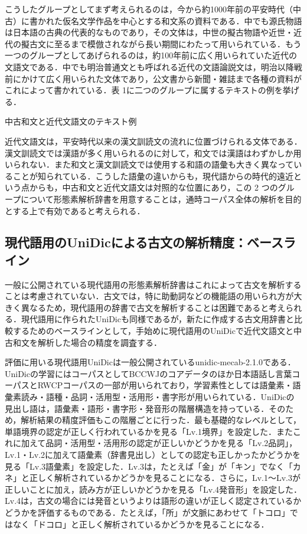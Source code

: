 \documentclass[japanese]{jnlp_1.4}
\begin{document}
こうしたグループとしてまず考えられるのは，今から約1000年前の平安時代（中古）に書かれた仮名文学作品を中心とする和文系の資料である．中でも源氏物語は日本語の古典の代表的なものであり，その文体は，中世の擬古物語や近世・近代の擬古文に至るまで模倣されながら長い期間にわたって用いられている．もう一つのグループとしてあげられるのは，約100年前に広く用いられていた近代の文語文である．中でも明治普通文とも呼ばれる近代の文語論説文は，明治以降戦前にかけて広く用いられた文体であり，公文書から新聞・雑誌まで各種の資料がこれによって書かれている．表 1に二つのグループに属するテキストの例を挙げる．

\begin{table}[t]
\caption{中古和文と近代文語文のテキスト例}
\label{tab1}

\end{table}

近代文語文は，平安時代以来の漢文訓読文の流れに位置づけられる文体である．漢文訓読文では漢語が多く用いられるのに対して，和文では漢語はわずかしか用いられない．また和文と漢文訓読文では使用する和語の語彙も大きく異なっていることが知られている．こうした語彙の違いからも，現代語からの時代的遠近という点からも，中古和文と近代文語文は対照的な位置にあり，この 2 つのグループについて形態素解析辞書を用意することは，通時コーパス全体の解析を目的とする上で有効であると考えられる．



\subsection{現代語用のUniDicによる古文の解析精度：ベースライン}

一般に公開されている現代語用の形態素解析辞書はこれによって古文を解析することは考慮されていない．古文では，特に助動詞などの機能語の用いられ方が大きく異なるため，現代語用の辞書で古文を解析することは困難であると考えられる．現代語用に作られたUniDicも同様であるが，新たに作成する古文用辞書と比較するためのベースラインとして，手始めに現代語用のUniDicで近代文語文と中古和文を解析した場合の精度を調査する．

評価に用いる現代語用UniDicは一般公開されているunidic-mecab-2.1.0である．UniDicの学習にはコーパスとしてBCCWJのコアデータのほか日本語話し言葉コーパスとRWCPコーパスの一部が用いられており，学習素性としては語彙素・語彙素読み・語種・品詞・活用型・活用形・書字形が用いられている\cite{Den2008}．UniDicの見出し語は，語彙素・語形・書字形・発音形の階層構造を持っている．そのため，解析結果の精度評価もこの階層ごとに行った．最も基礎的なレベルとして，単語境界の認定が正しく行われているかを見る「Lv.1境界」を設定した．またこれに加えて品詞・活用型・活用形の認定が正しいかどうかを見る「Lv.2品詞」，Lv.1・Lv.2に加えて語彙素（辞書見出し）としての認定も正しかったかどうかを見る「Lv.3語彙素」を設定した．Lv.3は，たとえば「金」が「キン」でなく「カネ」と正しく解析されているかどうかを見ることになる．さらに，Lv.1〜Lv.3が正しいことに加え，読み方が正しいかどうかを見る「Lv.4発音形」を設定した．Lv.4は，古文の場合には発音というよりは語形の違いが正しく認定されているかどうかを評価するものである．たとえば，「所」が文脈にあわせて「トコロ」ではなく「ドコロ」と正しく解析されているかどうかを見ることになる．
\end{document}
